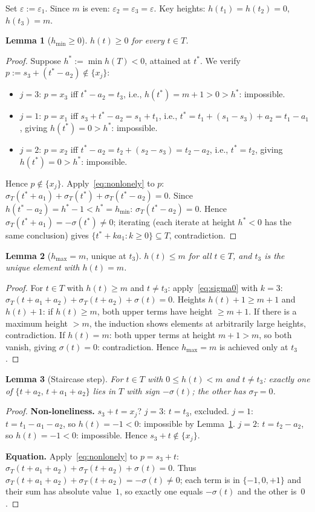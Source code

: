 \documentclass{article}
\newtheorem{lemma}{Lemma}
\begin{document}
Set $\varepsilon:=\varepsilon_1$.  Since $m$ is even: $\varepsilon_2=\varepsilon_3=\varepsilon$.
Key heights: $h(t_1)=h(t_2)=0$, $h(t_3)=m$.

\begin{lemma}[$h_{\min}\ge 0$]\label{lem:betamin}
$h(t)\ge 0$ for every $t\in T$.
\end{lemma}
\begin{proof}
Suppose $h^*:=\min h(T)<0$, attained at $t^*$.
We verify $p:=s_3+(t^*-a_2)\notin\{x_j\}$:
\begin{itemize}
\item $j=3$: $p=x_3$ iff $t^*-a_2=t_3$, i.e., $h(t^*)=m+1>0>h^*$: impossible.
\item $j=1$: $p=x_1$ iff $s_3+t^*-a_2=s_1+t_1$, i.e., $t^*=t_1+(s_1-s_3)+a_2=t_1-a_1$,
  giving $h(t^*)=0>h^*$: impossible.
\item $j=2$: $p=x_2$ iff $t^*-a_2=t_2+(s_2-s_3)=t_2-a_2$, i.e., $t^*=t_2$,
  giving $h(t^*)=0>h^*$: impossible.
\end{itemize}
Hence $p\notin\{x_j\}$.  Apply~\eqref{eq:nonlonely} to $p$:
$\sigma_T(t^*+a_1)+\sigma_T(t^*)+\sigma_T(t^*-a_2)=0$.
Since $h(t^*-a_2)=h^*-1<h^*=h_{\min}$: $\sigma_T(t^*-a_2)=0$.
Hence $\sigma_T(t^*+a_1)=-\sigma(t^*)\ne 0$; iterating (each iterate at height $h^*<0$
has the same conclusion) gives $\{t^*+ka_1:k\ge 0\}\subseteq T$, contradiction.
\end{proof}

\begin{lemma}[$h_{\max}=m$, unique at $t_3$]\label{lem:betamax}
$h(t)\le m$ for all $t\in T$, and $t_3$ is the unique element with $h(t)=m$.
\end{lemma}
\begin{proof}
For $t\in T$ with $h(t)\ge m$ and $t\ne t_3$: apply~\eqref{eq:sigma0} with $k=3$:
$\sigma_T(t+a_1+a_2)+\sigma_T(t+a_2)+\sigma(t)=0$.
Heights $h(t)+1\ge m+1$ and $h(t)+1$: if $h(t)\ge m$, both upper terms have height $\ge m+1$.
If there is a maximum height $>m$, the induction shows elements at arbitrarily large heights,
contradiction.
If $h(t)=m$: both upper terms at height $m+1>m$, so both vanish, giving $\sigma(t)=0$: contradiction.
Hence $h_{\max}=m$ is achieved only at $t_3$.
\end{proof}

\begin{lemma}[Staircase step]\label{lem:step}
For $t\in T$ with $0\le h(t)<m$ and $t\ne t_3$:
exactly one of $\{t+a_2,\,t+a_1+a_2\}$ lies in $T$ with sign $-\sigma(t)$;
the other has $\sigma_T=0$.
\end{lemma}
\begin{proof}
\textbf{Non-loneliness.}
$s_3+t=x_j$?
$j=3$: $t=t_3$, excluded.
$j=1$: $t=t_1-a_1-a_2$, so $h(t)=-1<0$: impossible by Lemma~\ref{lem:betamin}.
$j=2$: $t=t_2-a_2$, so $h(t)=-1<0$: impossible.
Hence $s_3+t\notin\{x_j\}$.

\textbf{Equation.}
Apply~\eqref{eq:nonlonely} to $p=s_3+t$:
$\sigma_T(t+a_1+a_2)+\sigma_T(t+a_2)+\sigma(t)=0$.
Thus $\sigma_T(t+a_1+a_2)+\sigma_T(t+a_2)=-\sigma(t)\ne 0$;
each term is in $\{-1,0,+1\}$ and their sum has absolute value~$1$,
so exactly one equals $-\sigma(t)$ and the other is~$0$.
\end{proof}
\end{document}
